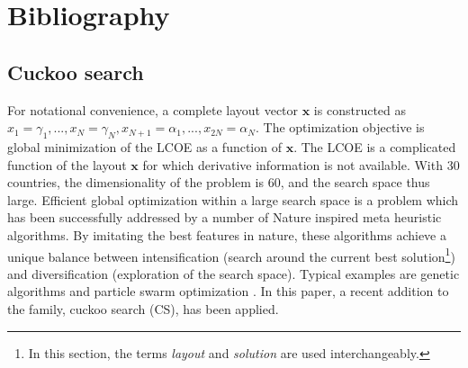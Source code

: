 \documentclass[a4paper, 12pt, sort&compress]{elsarticle}%
\begin{document}

\color{black}

\section*{Bibliography}



\appendix

\subsection{Cuckoo search}
\label{sec:cuckoo-search}



For notational convenience, a complete layout vector $\boldsymbol x$
is constructed as
$x_{1} = \gamma_{1}, ..., x_{N} =\gamma_{N}, x_{N+1} = \alpha_{1}, ...,
x_{2N} = \alpha_{N}$.
The optimization objective is global minimization of the LCOE as a
function of $\boldsymbol x$. The LCOE is a complicated function of the
layout $\boldsymbol x$ for which derivative information is not
available. With 30 countries, the dimensionality of the problem is 60,
and the search space thus large. Efficient global optimization within
a large search space is a problem which has been successfully
addressed by a number of Nature inspired meta heuristic algorithms. By
imitating the best features in nature, these algorithms achieve a
unique balance between intensification (search around the current best
solution\footnote{In this section, the terms \textit{layout} and
  \textit{solution} are used interchangeably.})
and diversification (exploration of the search space). Typical
examples are genetic algorithms \cite{Goldberg1989} and particle swarm
optimization \cite{Kennedy95}. In this paper, a recent addition
\cite{YangDeb} to the family, cuckoo search (CS), has been applied.
\end{document}
